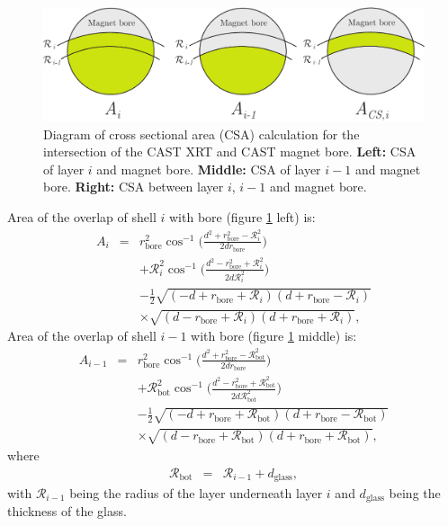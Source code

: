 \begin{figure}[htbp]
  \centering
    \includegraphics[width=0.9\linewidth]{figures/cast/cross_section_area.pdf}
  \caption{\footnotesize Diagram of cross sectional area (CSA) calculation for the intersection of the CAST XRT and CAST magnet bore. \textbf{Left:} CSA of layer $i$ and magnet bore. \textbf{Middle:} CSA of layer $i-1$ and magnet bore. \textbf{Right:} CSA between layer $i$, $i-1$ and magnet bore.}
  \label{fig:cross_section_area}
\end{figure}

Area of the overlap of shell $i$ with bore (figure \ref{fig:cross_section_area} left) is:
\begin{eqnarray}\label{eq:overlap1}
  A_{i} &=& r_{\text{bore}}^2\cos^{-1}\Big(\frac{d^2+r_{\text{bore}}^2-\mathcal{R}_{i}^2}{2dr_{\text{bore}}}\Big)\nonumber\\
  &&+\mathcal{R}_{i}^2\cos^{-1}\Big(\frac{d^2-r_{\text{bore}}^2+\mathcal{R}_{i}^2}{2d\mathcal{R}_{i}^2}\Big)\nonumber\\
  &&-\frac{1}{2}\sqrt{(-d+r_{\text{bore}}+\mathcal{R}_{i})(d+r_{\text{bore}}-\mathcal{R}_{i})}\nonumber\\
  &&\times\sqrt{(d-r_{\text{bore}}+\mathcal{R}_{i})(d+r_{\text{bore}}+\mathcal{R}_{i})},
\end{eqnarray}
Area of the overlap of shell $i-1$ with bore (figure \ref{fig:cross_section_area} middle) is:
\begin{eqnarray}\label{eq:overlap2}
  A_{i-1} &=& r_{\text{bore}}^2\cos^{-1}\Big(\frac{d^2+r_{\text{bore}}^2-\mathcal{R}_{\text{bot}}^2}{2dr_{\text{bore}}}\Big)\nonumber\\
  &&+\mathcal{R}_{\text{bot}}^2\cos^{-1}\Big(\frac{d^2-r_{\text{bore}}^2+\mathcal{R}_{\text{bot}}^2}{2d\mathcal{R}_{\text{bot}}^2}\Big)\nonumber\\
  &&-\frac{1}{2}\sqrt{(-d+r_{\text{bore}}+\mathcal{R}_{\text{bot}})(d+r_{\text{bore}}-\mathcal{R}_{\text{bot}})}\nonumber\\
  &&\times\sqrt{(d-r_{\text{bore}}+\mathcal{R}_{\text{bot}})(d+r_{\text{bore}}+\mathcal{R}_{\text{bot}})},
\end{eqnarray}
where
\begin{eqnarray}\label{eq:overlap3}
  \mathcal{R}_{\text{bot}} &=& \mathcal{R}_{i-1} + d_{\text{glass}},
\end{eqnarray}
with $\mathcal{R}_{i-1}$ being the radius of the layer underneath layer $i$ and $d_{\text{glass}}$ being the thickness of the glass.

